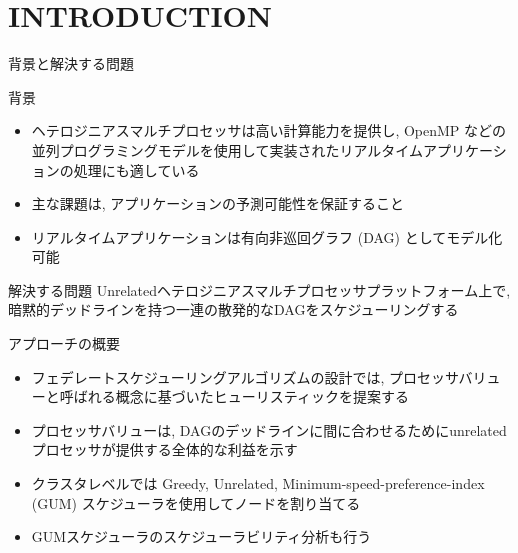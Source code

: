 
\section{INTRODUCTION}
\label{sec: introduction}

\begin{frame}{背景と解決する問題}
    \begin{block}{背景}
        \setlength{\linewidth}{0.98\columnwidth}
        \begin{itemize}
            \item ヘテロジニアスマルチプロセッサは高い計算能力を提供し, OpenMP などの並列プログラミングモデルを使用して実装されたリアルタイムアプリケーションの処理にも適している
            \item 主な課題は, アプリケーションの予測可能性を保証すること
            \item リアルタイムアプリケーションは有向非巡回グラフ (DAG) としてモデル化可能
        \end{itemize}
    \end{block}
    \begin{block}{解決する問題}
        Unrelatedヘテロジニアスマルチプロセッサプラットフォーム上で, 暗黙的デッドラインを持つ一連の散発的なDAGをスケジューリングする
    \end{block}
\end{frame}

\begin{frame}{アプローチの概要}
    \begin{itemize}
        \item フェデレートスケジューリングアルゴリズムの設計では, プロセッサバリューと呼ばれる概念に基づいたヒューリスティックを提案する
        \item プロセッサバリューは, DAGのデッドラインに間に合わせるためにunrelatedプロセッサが提供する全体的な利益を示す
        \item クラスタレベルでは Greedy, Unrelated, Minimum-speed-preference-index (GUM) スケジューラを使用してノードを割り当てる
        \item GUMスケジューラのスケジューラビリティ分析も行う
    \end{itemize}
\end{frame}
